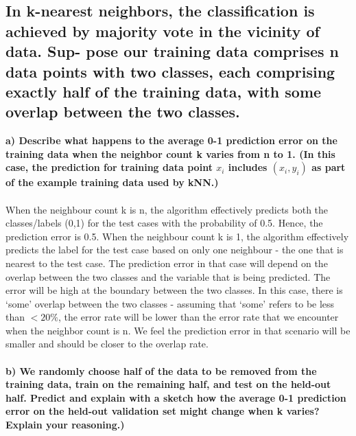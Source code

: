 \documentclass[11pt,letterpaper]{article}
\begin{document}
\subsection{In k-nearest neighbors, the classification is achieved by majority vote in the vicinity of data. Sup- pose our training data comprises n data points with two classes, each comprising exactly half of the training data, with some overlap between the two classes.}

\textbf{a) Describe what happens to the average 0-1 prediction error on the training data when the neighbor count k varies from n to 1. (In this case, the prediction for training data point $x_i$ includes $(x_i , y_i)$ as part of the example training data used by kNN.)}\\\\
When the neighbour count k is n, the algorithm effectively predicts both the classes/labels (0,1) for the test cases with the probability of 0.5. Hence, the prediction error is 0.5.
When the neighbour count k is 1, the algorithm effectively predicts the label for the test case based on only one neighbour - the one that is nearest to the test case. The prediction error in that case will depend on the overlap between the two classes and the variable that is being predicted. The error will be high at the boundary between the two classes. In this case, there is ‘some’ overlap between the two classes -  assuming that ‘some’ refers to be less than $<20\%$, the error rate will be lower than the error rate that we encounter when the neighbor count is n. We feel the prediction error in that scenario will be smaller and should be closer to the overlap rate.\\\\

\textbf{b) We randomly choose half of the data to be removed from the training data, train on the remaining half, and test on the held-out half. Predict and explain with a sketch how the average 0-1 prediction error on the held-out validation set might change when k varies? Explain your reasoning.)}\\\\
\end{document}
